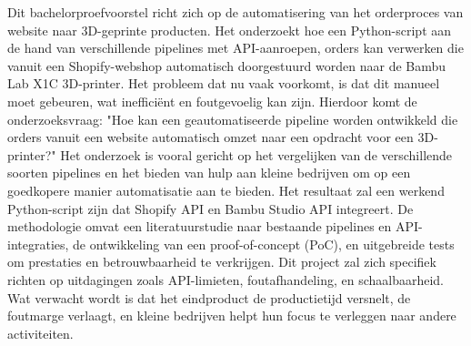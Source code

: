  Dit bachelorproefvoorstel richt zich op de automatisering van het orderproces van website naar 3D-geprinte producten. Het onderzoekt hoe een Python-script aan de hand van verschillende pipelines met API-aanroepen, orders kan verwerken die vanuit een Shopify-webshop automatisch doorgestuurd worden naar de Bambu Lab X1C 3D-printer. Het probleem dat nu vaak voorkomt, is dat dit manueel moet gebeuren, wat inefficiënt en foutgevoelig kan zijn. Hierdoor komt de onderzoeksvraag: "Hoe kan een geautomatiseerde pipeline worden ontwikkeld die orders vanuit een website automatisch omzet naar een opdracht voor een 3D-printer?" Het onderzoek is vooral gericht op het vergelijken van de verschillende soorten pipelines en het bieden van hulp aan kleine bedrijven om op een goedkopere manier automatisatie aan te bieden. Het resultaat zal een werkend Python-script zijn dat Shopify API en Bambu Studio API integreert. De methodologie omvat een literatuurstudie naar bestaande pipelines en API-integraties, de ontwikkeling van een proof-of-concept (PoC), en uitgebreide tests om prestaties en betrouwbaarheid te verkrijgen. Dit project zal zich specifiek richten op uitdagingen zoals API-limieten, foutafhandeling, en schaalbaarheid. Wat verwacht wordt is dat het eindproduct de productietijd versnelt, de foutmarge verlaagt, en kleine bedrijven helpt hun focus te verleggen naar andere activiteiten.
